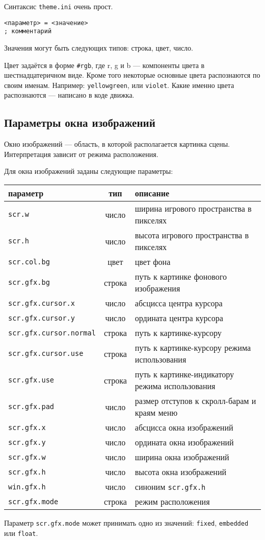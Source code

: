 \documentclass[a4paper,12pt]{article}
\begin{document}
Синтаксис \verb/theme.ini/ очень прост.

\begin{verbatim}
<параметр> = <значение>
; комментарий
\end{verbatim}

Значения могут быть следующих типов: строка, цвет, число.

Цвет задаётся в форме \verb/#rgb/, где r, g и b --- компоненты цвета в шестнадцатеричном виде. Кроме того некоторые основные цвета распознаются по своим именам. Например: \verb/yellowgreen/, или \verb/violet/. Какие именно цвета распознаются --- написано в коде движка.

\newpage

\subsection{Параметры окна изображений}

Окно изображений --- область, в которой располагается картинка сцены. Интерпретация зависит от режима расположения.

Для окна изображений заданы следующие параметры:

\newcommand{\tabParam}[3]{%
\texttt{#1} & #2 & #3 \\
\hline
}

\begin{tabular}{|l|c|l|}
\hline
параметр & тип & описание \\
\hline
\tabParam{scr.w}{число}{ширина игрового пространства в пикселях}
\tabParam{scr.h}{число}{высота игрового пространства в пикселях}
\tabParam{scr.col.bg}{цвет}{цвет фона}
\tabParam{scr.gfx.bg}{строка}{путь к картинке фонового изображения}
\tabParam{scr.gfx.cursor.x}{число}{абсцисса центра курсора}
\tabParam{scr.gfx.cursor.y}{число}{ордината центра курсора}
\tabParam{scr.gfx.cursor.normal}{строка}{путь к картинке-курсору}
\tabParam{scr.gfx.cursor.use}{строка}{путь к картинке-курсору режима использования}
\tabParam{scr.gfx.use}{строка}{путь к картинке-индикатору режима использования}
\tabParam{scr.gfx.pad}{число}{размер отступов к скролл-барам и краям меню}
\tabParam{scr.gfx.x}{число}{абсцисса окна изображений}
\tabParam{scr.gfx.y}{число}{ордината окна изображений}
\tabParam{scr.gfx.w}{число}{ширина окна изображений}
\tabParam{scr.gfx.h}{число}{высота окна изображений}
\tabParam{win.gfx.h}{число}{синоним \texttt{scr.gfx.h}}
\tabParam{scr.gfx.mode}{строка}{режим расположения}
\end{tabular}

Параметр \texttt{scr.gfx.mode} может принимать одно из значений: \verb/fixed/, \verb/embedded/ или \verb/float/.
\end{document}
